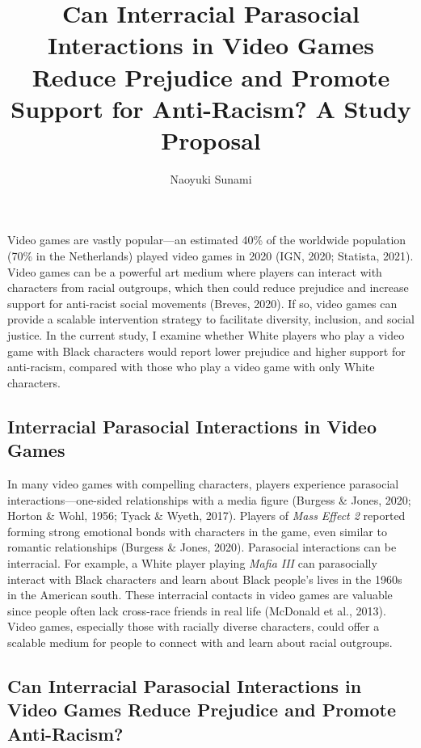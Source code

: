 \documentclass[
  english,
  man, noextraspace,floatsintext]{apa6}
\title{Can Interracial Parasocial Interactions in Video Games Reduce Prejudice and Promote Support for Anti-Racism? A Study Proposal}
\author{Naoyuki Sunami\textsuperscript{}}
\date{}
\affiliation{\phantom{0}}
\begin{document}
\maketitle

Video games are vastly popular---an estimated 40\% of the worldwide population (70\% in the Netherlands) played video games in 2020 (IGN, 2020; Statista, 2021). Video games can be a powerful art medium where players can interact with characters from racial outgroups, which then could reduce prejudice and increase support for anti-racist social movements (Breves, 2020). If so, video games can provide a scalable intervention strategy to facilitate diversity, inclusion, and social justice. In the current study, I examine whether White players who play a video game with Black characters would report lower prejudice and higher support for anti-racism, compared with those who play a video game with only White characters.

\hypertarget{interracial-parasocial-interactions-in-video-games}{%
\subsection{Interracial Parasocial Interactions in Video Games}\label{interracial-parasocial-interactions-in-video-games}}

In many video games with compelling characters, players experience parasocial interactions---one-sided relationships with a media figure (Burgess \& Jones, 2020; Horton \& Wohl, 1956; Tyack \& Wyeth, 2017). Players of \emph{Mass Effect 2} reported forming strong emotional bonds with characters in the game, even similar to romantic relationships (Burgess \& Jones, 2020). Parasocial interactions can be interracial. For example, a White player playing \emph{Mafia III} can parasocially interact with Black characters and learn about Black people's lives in the 1960s in the American south. These interracial contacts in video games are valuable since people often lack cross-race friends in real life (McDonald et al., 2013). Video games, especially those with racially diverse characters, could offer a scalable medium for people to connect with and learn about racial outgroups.

\hypertarget{can-interracial-parasocial-interactions-in-video-games-reduce-prejudice-and-promote-anti-racism}{%
\subsection{Can Interracial Parasocial Interactions in Video Games Reduce Prejudice and Promote Anti-Racism?}\label{can-interracial-parasocial-interactions-in-video-games-reduce-prejudice-and-promote-anti-racism}}
\end{document}

